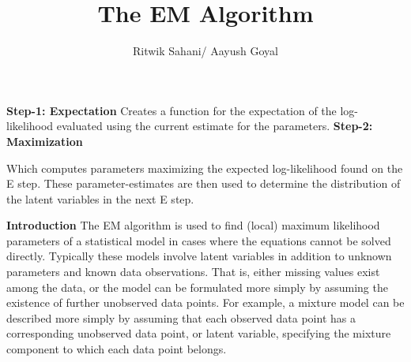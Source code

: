 \documentclass[11pt]{beamer}
\author{Ritwik Sahani/ Aayush Goyal}
\title{The EM Algorithm}
\institute{IIT Hyderabad}
\begin{document}
\begin{frame}
\titlepage{}
\end{frame}


\begin{frame}
\textbf{Step-1: Expectation}\linebreak
\linebreak
\textsf{Creates a function for the expectation of the log-likelihood evaluated using the
current estimate for the parameters.}
\linebreak
\linebreak
\linebreak
\linebreak\linebreak
\textbf{Step-2: Maximization}
\linebreak

\textsf{Which computes parameters maximizing the expected log-likelihood found on the
E step. These parameter-estimates are then used to determine the distribution of
the latent variables in the next E step.}

\end{frame}


\begin{frame}
\textbf{Introduction}
\linebreak\linebreak
\textsf{The EM algorithm is used to find (local) maximum likelihood parameters of a
statistical model in cases where the equations cannot be solved directly. Typically
these models involve latent variables in addition to unknown parameters and known
data observations. That is, either missing values exist among the data, or the model
can be formulated more simply by assuming the existence of further unobserved
data points. For example, a mixture model can be described more simply by
assuming that each observed data point has a corresponding unobserved data
point, or latent variable, specifying the mixture component to which each data point
belongs.}
\end{frame}
\end{document}
